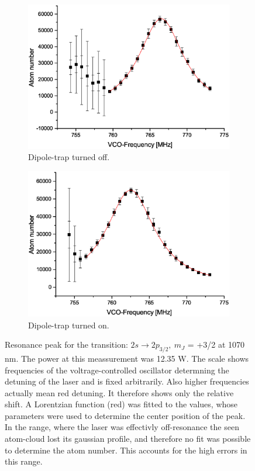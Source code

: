 \begin{figure}[h]
\centering
\begin{subfigure}[b]{0.48\textwidth}
                \includegraphics[width=\textwidth]{withoutodt}
                \caption{Dipole-trap turned off.}
\end{subfigure}
\begin{subfigure}[b]{0.48\textwidth}
               \includegraphics[width=\textwidth]{withodt}
                \caption{Dipole-trap turned on.}
\end{subfigure}

\caption{Resonance peak for the transition: $2s\rightarrow2p_{3/2},\ m_J$ = +3/2 at 1070 nm. The power at this meassurement was 12.35 W. The scale shows frequencies of the voltrage-controlled oscillator determning the detuning of the laser and is fixed arbitrarily. Also higher frequencies actually mean red detuning. It therefore shows only the relative shift. A Lorentzian function (red) was fitted to the values, whose parameters were used to determine the center position of the peak. In the range, where the laser was effectivly off-resonance the seen atom-cloud lost its gaussian profile, and therefore no fit was possible to determine the atom number. This accounts for the high errors in this range.}
\label{resonance}
\end{figure}	
